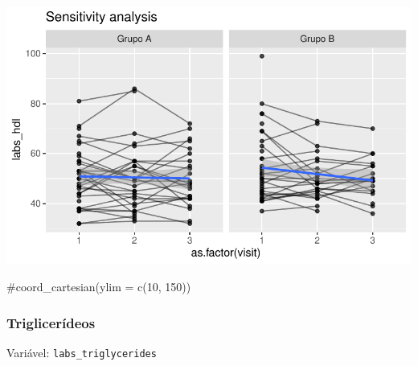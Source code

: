 \documentclass[
  12pt,
]{article}
\newenvironment{Shaded}{\begin{snugshade}}{\end{snugshade}}
\newcommand{\CommentTok}[1]{\textcolor[rgb]{0.37,0.37,0.37}{#1}}
\begin{document}
\includegraphics{Outcomes_files/figure-pdf/labs_hdl_6-2.pdf}

\begin{Shaded}
\begin{Highlighting}[]
    \CommentTok{\#coord\_cartesian(ylim = c(10, 150))}
\end{Highlighting}
\end{Shaded}

\subsubsection{Triglicerídeos}\label{trigliceruxeddeos}

Variável: \texttt{labs\_triglycerides}
\end{document}
